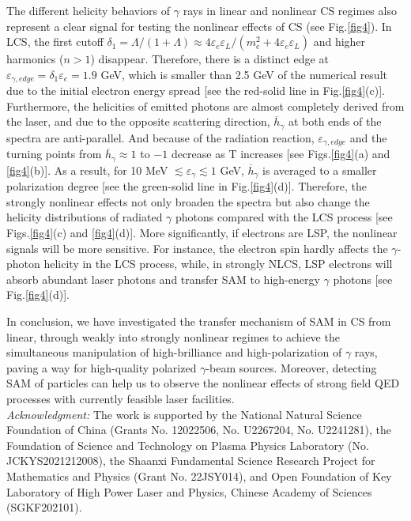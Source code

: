 \documentclass[10pt,twocolumn,showpacs,amsmath,amssymb,floatfix,superscriptaddress]{revtex4-2}
\begin{document}
The different helicity behaviors of $\gamma$ rays in linear and nonlinear CS regimes also represent a clear signal for testing the nonlinear effects of CS (see Fig.\ref{fig4}). In LCS, the first cutoff $\delta_1 = \Lambda/(1+\Lambda) \approx 4\varepsilon_{e} \varepsilon_L/(m_e^2+4\varepsilon_{e} \varepsilon_L)$ and higher harmonics ($n > 1$) disappear. Therefore, there is a distinct edge at $\varepsilon_{\gamma,edge}=\delta_1 \varepsilon_{e}=1.9$ GeV, which is smaller than 2.5 GeV of the numerical result due to the initial electron energy spread [see the red-solid line in Fig.\ref{fig4}(c)]. Furthermore, the helicities of emitted photons are almost completely derived  from the laser, and due to the opposite scattering direction, $\overline{h}_\gamma$ at both ends of the spectra are anti-parallel. And because of the radiation reaction, $\varepsilon_{\gamma,edge}$ and the turning points from $\overline{h}_\gamma \approx 1$ to $-1$ decrease as T increases [see Figs.\ref{fig4}(a) and \ref{fig4}(b)]. As a result, for 10 MeV $\lesssim \varepsilon_\gamma \lesssim 1$ GeV, $\overline{h}_\gamma$ is averaged to a smaller polarization degree [see the green-solid line in Fig.\ref{fig4}(d)]. Therefore, the strongly nonlinear effects not only broaden the spectra but also change the helicity distributions of radiated $\gamma$ photons compared with the LCS process [see Figs.\ref{fig4}(c) and \ref{fig4}(d)]. More significantly, if electrons are LSP, the nonlinear signals will be more sensitive. For instance, the electron spin hardly affects the $\gamma$-photon helicity in the LCS process, while, in strongly NLCS, LSP electrons will absorb abundant laser photons and transfer SAM to high-energy $\gamma$ photons [see Fig.\ref{fig4}(d)].
  
In conclusion,  we have investigated the transfer mechanism of SAM in CS from linear, through weakly into strongly nonlinear regimes to achieve the simultaneous manipulation of high-brilliance and high-polarization of $\gamma$ rays, paving a way for high-quality polarized $\gamma$-beam sources. Moreover, detecting SAM of particles can help us to observe the nonlinear effects of strong field QED processes with currently feasible laser facilities.\\

{\emph{Acknowledgment:} The work is supported by the National Natural Science Foundation of China (Grants No. 12022506, No. U2267204, No. U2241281), the Foundation of Science and Technology on Plasma Physics Laboratory (No. JCKYS2021212008), the Shaanxi Fundamental Science Research Project for Mathematics and Physics (Grant No. 22JSY014), and Open Foundation of Key Laboratory of High Power Laser and Physics, Chinese Academy of Sciences (SGKF202101).}


\end{document}
